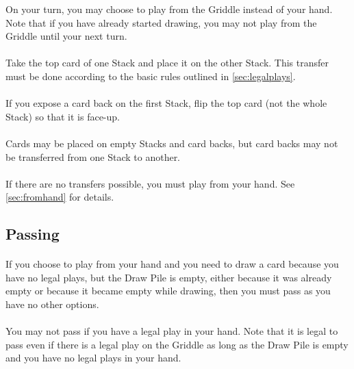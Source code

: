 \documentclass{article}
\begin{document}
On your turn, you may choose to play from the Griddle instead of your hand. Note that if you have already started drawing, you may not play from the Griddle until your next turn.

\paragraph{} \label{par:transfer}
Take the top card of one Stack and place it on the other Stack. This transfer must be done according to the basic rules outlined in \autoref{sec:legalplays}.

\paragraph{} \label{par:expose}
If you expose a card back on the first Stack, flip the top card (not the whole Stack) so that it is face-up.

\paragraph{} \label{par:nocardbacktransfer}
Cards may be placed on empty Stacks and card backs, but card backs may not be transferred from one Stack to another.

\paragraph{} \label{par:notransferfallback}
If there are no transfers possible, you must play from your hand. See \autoref{sec:fromhand} for details.

\subsection{Passing}
\label{sec:passing}

\paragraph{} \label{par:passcondition}
If you choose to play from your hand and you need to draw a card because you have no legal plays, but the Draw Pile is empty, either because it was already empty or because it became empty while drawing, then you must pass as you have no other options.

\paragraph{} \label{par:passrestriction}
You may not pass if you have a legal play in your hand. Note that it is legal to pass even if there is a legal play on the Griddle as long as the Draw Pile is empty and you have no legal plays in your hand.
\end{document}
